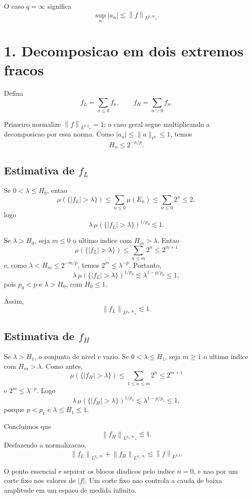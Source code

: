 \documentclass[12pt,a4paper]{article}
\newcommand{\norm}[2]{\left\|#1\right\|_{#2}}
\begin{document}
O caso $q=\infty$ significa
\[
\sup_n|a_n|\lesssim \norm{f}{L^{p,\infty}}_*.
\]

\section*{1. Decomposicao em dois extremos fracos}

Defina
\[
f_L=\sum_{n\leq 0}f_n, \qquad f_H=\sum_{n>0}f_n.
\]

Primeiro normalize $\norm{f}{L^{p,q}}_*=1$; o caso geral segue multiplicando
a decomposicao por essa norma. Como $|a_n|\leq\|a\|_{\ell^q}\leq 1$, temos
\[
H_n\leq 2^{-n/p}.
\]

\subsection*{Estimativa de $f_L$}

Se $0<\lambda\leq H_0$, entao
\[
\mu(\{|f_L|>\lambda\})
\leq\sum_{n\leq 0}\mu(E_n)
\leq\sum_{n\leq 0}2^n\leq 2,
\]
logo
\[
\lambda\,\mu(\{|f_L|>\lambda\})^{1/p_0}\lesssim 1.
\]

Se $\lambda>H_0$, seja $m\leq 0$ o ultimo indice com $H_m>\lambda$. Entao
\[
\mu(\{|f_L|>\lambda\})
\leq\sum_{n\leq m}2^n\leq 2^{m+1}
\]
e, como $\lambda<H_m\leq 2^{-m/p}$, temos $2^m\leq\lambda^{-p}$. Portanto,
\[
\lambda\,\mu(\{|f_L|>\lambda\})^{1/p_0}
\lesssim \lambda^{1-p/p_0}\leq 1,
\]
pois $p_0<p$ e $\lambda>H_0$, com $H_0\leq 1$.

Assim,
\[
\norm{f_L}{L^{p_0,\infty}}_*\lesssim 1.
\]

\subsection*{Estimativa de $f_H$}

Se $\lambda>H_1$, o conjunto de nivel e vazio. Se $0<\lambda\leq H_1$,
seja $m\geq 1$ o ultimo indice com $H_m>\lambda$. Como antes,
\[
\mu(\{|f_H|>\lambda\})
\leq\sum_{1\leq n\leq m}2^n\leq 2^{m+1}
\]
e $2^m\leq\lambda^{-p}$. Logo
\[
\lambda\,\mu(\{|f_H|>\lambda\})^{1/p_1}
\lesssim \lambda^{1-p/p_1}\leq 1,
\]
porque $p<p_1$ e $\lambda\leq H_1\leq 1$.

Concluimos que
\[
\norm{f_H}{L^{p_1,\infty}}_*\lesssim 1.
\]
Desfazendo a normalizacao,
\[
\norm{f_L}{L^{p_0,\infty}}+\norm{f_H}{L^{p_1,\infty}}\lesssim \norm{f}{L^{p,q}}.
\]

O ponto essencial e separar os blocos diadicos pelo indice $n=0$, e nao por
um corte fixo nos valores de $|f|$. Um corte fixo nao controla a cauda de baixa
amplitude em um espaco de medida infinito.
\end{document}

